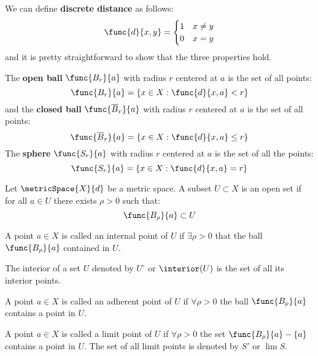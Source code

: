 \begin{example}
    We can define \textbf{discrete distance} as follows:
    \[\func{d}{x,y} =
        \begin{cases}
            1 & x\neq y \\
            0 & x=y
        \end{cases}
    \]
    and it is pretty straightforward to show that the three properties hold.
\end{example}

\begin{definition}
    The \textbf{open ball} \(\func{B_r}{a}\) with radius \(r\) centered at \(a\) is the set of all points:
    \[ \func{B_r}{a} = \{ x \in X : \func{d}{x,a} < r\}\]
    and the \textbf{closed ball} \(\func{\overline{B}_r}{a}\) with radius \(r\) centered at \(a\) is the set of all points:
    \[\func{\overline{B}_r}{a} = \{ x \in X: \func{d}{x,a} \leq r\} \]
    The \textbf{sphere} \(\func{S_r}{a}\) with radius \(r\) centered at \(a\) is the set of all the points:
    \[ \func{S_r}{a} = \{ x \in X: \func{d}{x,a}  = r\} \]
\end{definition}

\begin{definition} 
    Let \(\metricSpace{X}{d}\) be a metric space. A subset \(U \subset X\) is an open set if for all \(a \in U\) there exists \(\rho > 0\) such that:
    \[ \func{B_\rho}{a} \subset U\]
\end{definition}

\begin{definition} 
    A point \(a \in X\) is called an internal point of \(U\) if \(\exists \rho > 0\) that the ball \(\func{B_\rho}{a}\) contained in \(U\).
\end{definition}

\begin{definition} [Interior]
    The interior of a set \(U\) denoted by \(U^\circ\) or \(\interior (U)\) is the set of all its interior points.
\end{definition}

\begin{definition} 
    A point \(a \in X\) is called an adherent point of \(U\) if \(\forall \rho > 0\) the ball \(\func{B_\rho}{a}\) contains a point in \(U\).
\end{definition}

\begin{definition} 
    A point \(a \in X\) is called a limit point of \(U\) if \(\forall \rho > 0\) the set \(\func{B_\rho}{a} - \{ a\}\) contains a point in \(U\). The set of all limit points is denoted by \(S'\) or \(\lim S\).
\end{definition}


